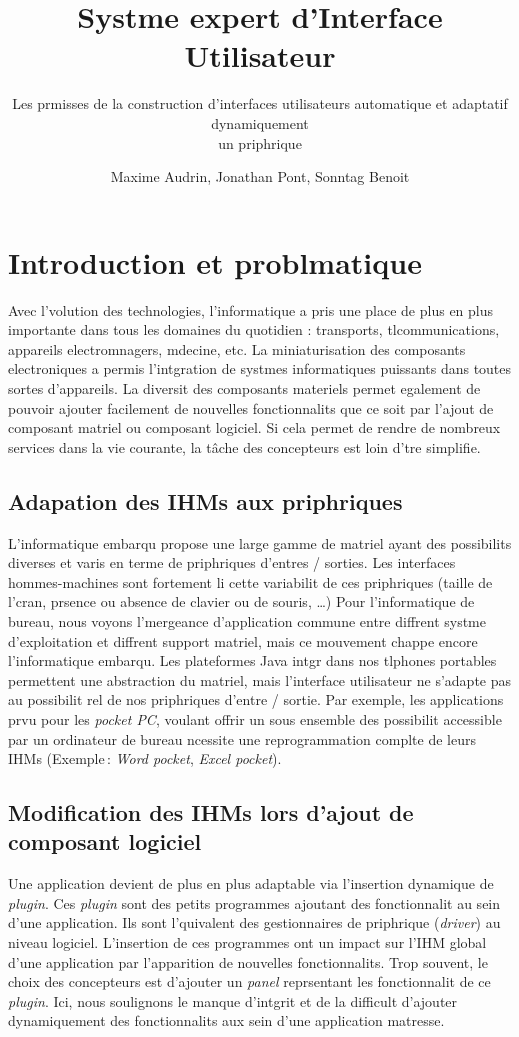 \documentclass[fleqn]{article-hermes}
\title[Interface Utilisateur Automatique]%
      {Systme expert d'Interface Utilisateur}
\subtitle{Les prmisses de la construction d'interfaces utilisateurs automatique et adaptatif dynamiquement\\  un priphrique}
\author{Maxime Audrin, Jonathan Pont, Sonntag Benoit}
\begin{document}

\maketitlepage

\section{Introduction et problmatique}
Avec l'volution des technologies, l'informatique a pris une place de
plus en plus importante dans tous les domaines du quotidien :
transports, tlcommunications, appareils electromnagers, mdecine, etc. 
La miniaturisation des composants electroniques a permis l'intgration
de systmes informatiques puissants dans toutes sortes d'appareils. 
La diversit des composants materiels permet egalement de
pouvoir ajouter facilement de nouvelles fonctionnalits que ce soit
par l'ajout de composant matriel ou composant logiciel. 
Si cela permet de rendre de nombreux services dans la vie
courante, la t\^{a}che des concepteurs est loin d'tre simplifie.

\subsection{Adapation des IHMs aux priphriques}
L'informatique embarqu propose une large gamme de
matriel ayant des possibilits diverses et varis en terme de
priphriques d'entres / sorties.
Les interfaces hommes-machines sont fortement li  cette variabilit
de ces priphriques (taille de l'cran, prsence
ou absence de clavier ou de souris, \ldots)
Pour l'informatique de bureau, nous voyons l'mergeance
d'application commune entre diffrent systme d'exploitation et
diffrent support matriel, mais ce mouvement chappe encore 
l'informatique embarqu.
Les plateformes Java intgr dans nos tlphones portables permettent
une abstraction du matriel, mais l'interface utilisateur ne s'adapte
pas au possibilit rel de nos priphriques d'entre / sortie.
Par exemple, les applications prvu pour les {\it{}pocket PC}, voulant
offrir un sous ensemble des possibilit accessible par un ordinateur de
bureau ncessite une reprogrammation complte de leurs IHMs (Exemple\,: 
{\it{}Word pocket}, {\it{}Excel pocket}).

\subsection{Modification des IHMs lors d'ajout de composant logiciel}
Une application devient de plus en plus adaptable via l'insertion
dynamique de {\it{}plugin}. Ces {\it{}plugin} sont des petits
programmes ajoutant des fonctionnalit au sein d'une application.
Ils sont l'quivalent des gestionnaires de priphrique ({\it{}driver})
au niveau logiciel.
L'insertion de ces programmes ont un impact sur l'IHM global d'une
application par l'apparition de nouvelles fonctionnalits.
Trop souvent, le choix des concepteurs est d'ajouter un {\it{}panel}
reprsentant les fonctionnalit de ce {\it{}plugin}. 
Ici, nous soulignons le manque d'intgrit et de la difficult
d'ajouter dynamiquement des fonctionnalits aux sein d'une
application matresse.
\end{document}
